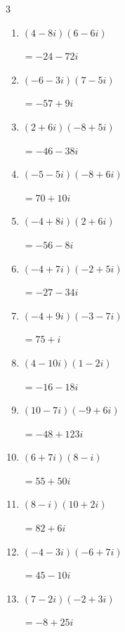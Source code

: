 \begin{multicols}{3}
\begin{enumerate}
        $\displaystyle =27+151i$

  \item $\displaystyle (4-8i)(6-6i)$

        $\displaystyle =-24-72i$

  \item $\displaystyle (-6-3i)(7-5i)$

        $\displaystyle =-57+9i$

  \item $\displaystyle (2+6i)(-8+5i)$

        $\displaystyle =-46-38i$

  \item $\displaystyle (-5-5i)(-8+6i)$

        $\displaystyle =70+10i$

  \item $\displaystyle (-4+8i)(2+6i)$

        $\displaystyle =-56-8i$

  \item $\displaystyle (-4+7i)(-2+5i)$

        $\displaystyle =-27-34i$

  \item $\displaystyle (-4+9i)(-3-7i)$

        $\displaystyle =75+i$

  \item $\displaystyle (4-10i)(1-2i)$

        $\displaystyle =-16-18i$

  \item $\displaystyle (10-7i)(-9+6i)$

        $\displaystyle =-48+123i$

  \item $\displaystyle (6+7i)(8-i)$

        $\displaystyle =55+50i$

\columnbreak %

  \item $\displaystyle (8-i)(10+2i)$

        $\displaystyle =82+6i$

  \item $\displaystyle (-4-3i)(-6+7i)$

        $\displaystyle =45-10i$

  \item $\displaystyle (7-2i)(-2+3i)$

        $\displaystyle =-8+25i$


\end{enumerate}
\end{multicols}
